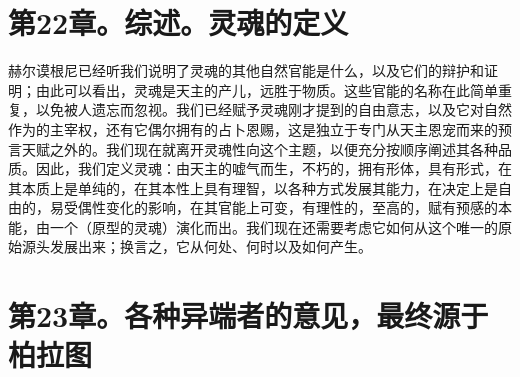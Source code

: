 
\section{第22章。综述。灵魂的定义}

赫尔谟根尼已经听我们说明了灵魂的其他自然官能是什么，以及它们的辩护和证明；由此可以看出，灵魂是天主的产儿，远胜于物质。这些官能的名称在此简单重复，以免被人遗忘而忽视。我们已经赋予灵魂刚才提到的自由意志，以及它对自然作为的主宰权，还有它偶尔拥有的占卜恩赐，这是独立于专门从天主恩宠而来的预言天赋之外的。我们现在就离开灵魂性向这个主题，以便充分按顺序阐述其各种品质。因此，我们定义灵魂：由天主的嘘气而生，不朽的，拥有形体，具有形式，在其本质上是单纯的，在其本性上具有理智，以各种方式发展其能力，在决定上是自由的，易受偶性变化的影响，在其官能上可变，有理性的，至高的，赋有预感的本能，由一个（原型的灵魂）演化而出。我们现在还需要考虑它如何从这个唯一的原始源头发展出来；换言之，它从何处、何时以及如何产生。\par


\section{第23章。各种异端者的意见，最终源于柏拉图}

